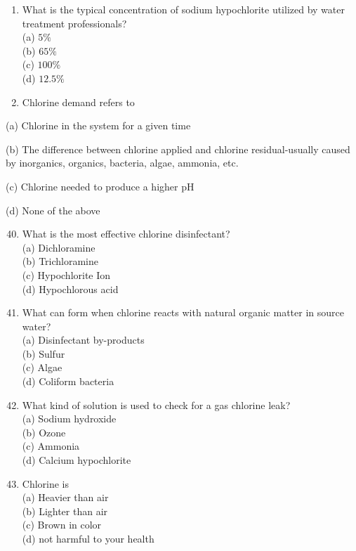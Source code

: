 \documentclass[10pt]{article}
\begin{document}
\begin{enumerate}
\begin{enumerate}
\begin{enumerate}
  \item What is the typical concentration of sodium hypochlorite utilized by water treatment professionals?\\
(a) $5 \%$\\
(b) $65 \%$\\
(c) $100 \%$\\
(d) $12.5 \%$\\

  \item Chlorine demand refers to

\end{enumerate}

(a) Chlorine in the system for a given time

(b) The difference between chlorine applied and chlorine residual-usually caused by inorganics, organics, bacteria, algae, ammonia, etc.

(c) Chlorine needed to produce a higher $\mathrm{pH}$

(d) None of the above

\begin{enumerate}
  \setcounter{enumi}{39}
  \item What is the most effective chlorine disinfectant?\\
(a) Dichloramine\\
(b) Trichloramine\\
(c) Hypochlorite Ion\\
(d) Hypochlorous acid\\

  \item What can form when chlorine reacts with natural organic matter in source water?\\
(a) Disinfectant by-products\\
(b) Sulfur\\
(c) Algae\\
(d) Coliform bacteria\\

  \item What kind of solution is used to check for a gas chlorine leak?\\
(a) Sodium hydroxide\\
(b) Ozone\\
(c) Ammonia\\
(d) Calcium hypochlorite\\

  \item Chlorine is\\
(a) Heavier than air\\
(b) Lighter than air\\
(c) Brown in color\\
(d) not harmful to your health\\


\end{enumerate}
\end{enumerate}
\end{enumerate}
\end{document}
